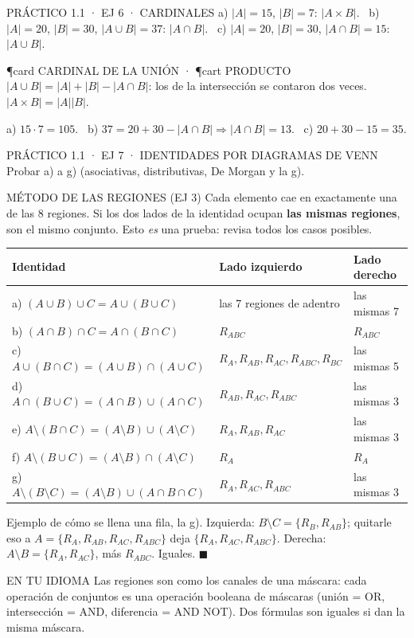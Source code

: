 \begin{enunciado}{PRÁCTICO 1.1 · EJ 6 · CARDINALES}
a) $|A|=15$, $|B|=7$: $|A\times B|$. \ b) $|A|=20$, $|B|=30$, $|A\cup B|=37$: $|A\cap B|$. \ c) $|A|=20$, $|B|=30$, $|A\cap B|=15$: $|A\cup B|$.
\end{enunciado}
\begin{uso}{\P{card} CARDINAL DE LA UNIÓN · \P{cart} PRODUCTO}
$|A\cup B|=|A|+|B|-|A\cap B|$: los de la intersección se contaron dos veces. $|A\times B|=|A||B|$.
\end{uso}
a) $15\cdot7=105$. \ b) $37=20+30-|A\cap B|\Rightarrow|A\cap B|=13$. \ c) $20+30-15=35$.

\begin{enunciado}{PRÁCTICO 1.1 · EJ 7 · IDENTIDADES POR DIAGRAMAS DE VENN}
Probar a) a g) (asociativas, distributivas, De Morgan y la g).
\end{enunciado}
\begin{uso}{MÉTODO DE LAS REGIONES (EJ 3)}
Cada elemento cae en exactamente una de las 8 regiones. Si los dos lados de la identidad ocupan \textbf{las mismas regiones}, son el mismo conjunto. Esto \emph{es} una prueba: revisa todos los casos posibles.
\end{uso}
\begin{center}\small
\begin{tabular}{@{}lll@{}}\toprule
Identidad & Lado izquierdo & Lado derecho\\\midrule
a) $(A\cup B)\cup C=A\cup(B\cup C)$ & las 7 regiones de adentro & las mismas 7\\
b) $(A\cap B)\cap C=A\cap(B\cap C)$ & $R_{ABC}$ & $R_{ABC}$\\
c) $A\cup(B\cap C)=(A\cup B)\cap(A\cup C)$ & $R_A,R_{AB},R_{AC},R_{ABC},R_{BC}$ & las mismas 5\\
d) $A\cap(B\cup C)=(A\cap B)\cup(A\cap C)$ & $R_{AB},R_{AC},R_{ABC}$ & las mismas 3\\
e) $A\setminus(B\cap C)=(A\setminus B)\cup(A\setminus C)$ & $R_A,R_{AB},R_{AC}$ & las mismas 3\\
f) $A\setminus(B\cup C)=(A\setminus B)\cap(A\setminus C)$ & $R_A$ & $R_A$\\
g) $A\setminus(B\setminus C)=(A\setminus B)\cup(A\cap B\cap C)$ & $R_A,R_{AC},R_{ABC}$ & las mismas 3\\\bottomrule
\end{tabular}
\end{center}
Ejemplo de cómo se llena una fila, la g). Izquierda: $B\setminus C=\{R_B,R_{AB}\}$; quitarle eso a $A=\{R_A,R_{AB},R_{AC},R_{ABC}\}$ deja $\{R_A,R_{AC},R_{ABC}\}$. Derecha: $A\setminus B=\{R_A,R_{AC}\}$, más $R_{ABC}$. Iguales. $\blacksquare$
\begin{tip}{EN TU IDIOMA}
Las regiones son como los canales de una máscara: cada operación de conjuntos es una operación booleana de máscaras (unión = OR, intersección = AND, diferencia = AND NOT). Dos fórmulas son iguales si dan la misma máscara.
\end{tip}


